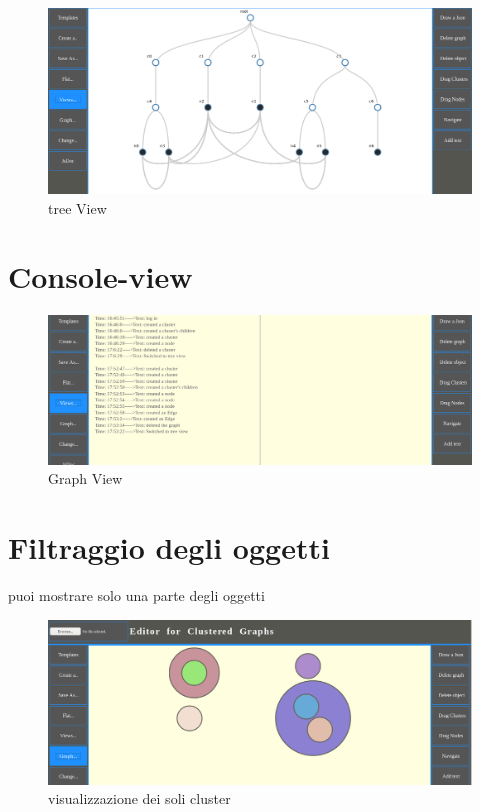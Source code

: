 {\begin{figure}[!htb]
	\begin{center}
		\includegraphics[width=1 \linewidth]{figure/treeView}
	\end{center}
	\caption{tree View\label{fig:treeView}}
\end{figure}
\section{Console-view}
\begin{figure}[!htb]
	\begin{center}
		\includegraphics[width=1 \linewidth]{figure/consoleView}
	\end{center}
	\caption{Graph View\label{fig:consoleView}}
\end{figure}

\section{Filtraggio degli oggetti}
puoi mostrare solo una parte degli oggetti
\begin{figure}[!htb]
	\begin{center}
		\includegraphics[width=1 \linewidth]{figure/clustersOnly}
	\end{center}
	\caption{visualizzazione dei soli cluster\label{fig:clustersOnly}}
\end{figure}

}

